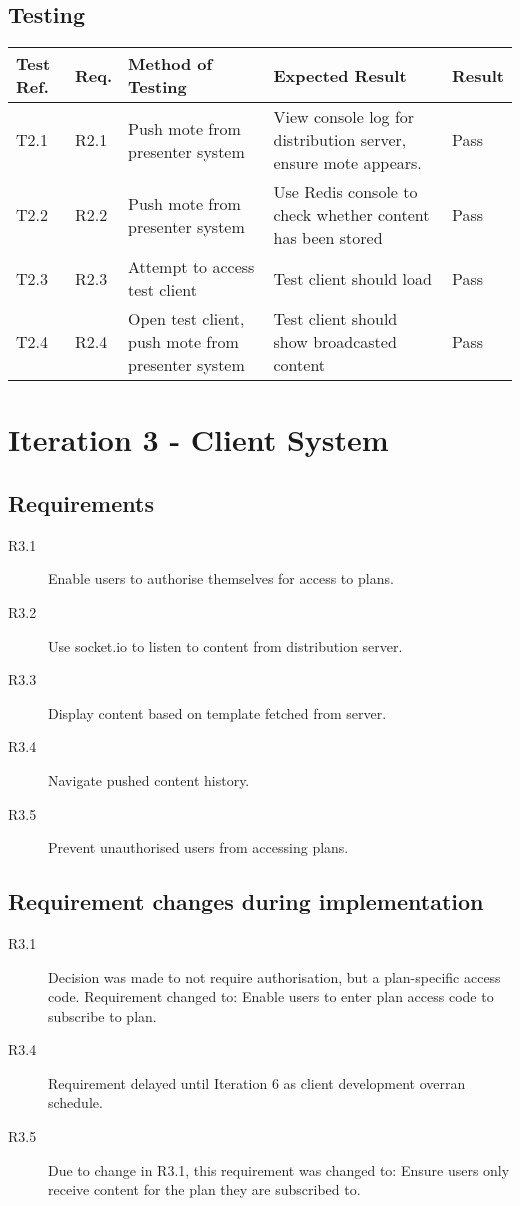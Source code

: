 \documentclass[a4papert,11pt,notitlepage]{article}
\begin{document}
\subsection{Testing}
\begin{tabular}{p{30pt} | p{25pt} | p{140pt} | p{140pt} || p{90pt}}
Test Ref. & Req. & Method of Testing & Expected Result & Result \\ \hline
T2.1 & R2.1 & Push mote from presenter system & View console log for distribution server, ensure mote appears. & Pass \\
T2.2 & R2.2 & Push mote from presenter system & Use Redis console to check whether content has been stored & Pass \\
T2.3 & R2.3 & Attempt to access test client & Test client should load & Pass \\
T2.4 & R2.4 & Open test client, push mote from presenter system & Test client should show broadcasted content & Pass \\
\end{tabular}

\section{Iteration 3 - Client System}
\subsection{Requirements}
\begin{description}
\item[R3.1] Enable users to authorise themselves for access to plans.
\item[R3.2] Use socket.io to listen to content from distribution server.
\item[R3.3] Display content based on template fetched from server.
\item[R3.4] Navigate pushed content history.
\item[R3.5] Prevent unauthorised users from accessing plans.
\end{description}

\subsection{Requirement changes during implementation}
\begin{description}
\item[R3.1] Decision was made to not require authorisation, but a plan-specific access code. Requirement changed to: Enable users to enter plan access code to subscribe to plan.
\item[R3.4] Requirement delayed until Iteration 6 as client development overran schedule.
\item[R3.5] Due to change in R3.1, this requirement was changed to: Ensure users only receive content for the plan they are subscribed to.
\end{description}
\end{document}
